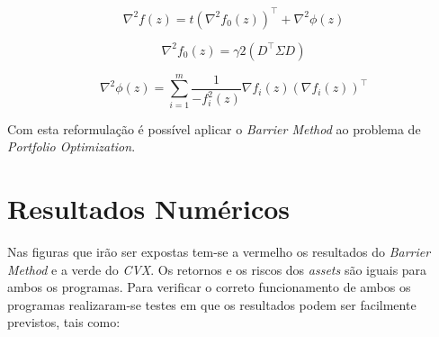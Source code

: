 \documentclass[a4paper]{IEEEtran}
\begin{document}
\begin{equation}
\label{eq.hess}
\nabla^2 f(z) = t (\nabla^2 f_0(z))^\top + \nabla^2 \phi (z)
\end{equation}

\begin{equation}
\label{eq.hesss}
\nabla^2 f_0 (z) = \gamma 2 (D^\top \Sigma D) 
\end{equation}

\begin{equation}
\label{eq.hessss}
\nabla^2 \phi (z) = \sum_{i=1}^{m} \frac{1}{-f_i^2 (z)} \nabla f_i (z) (\nabla f_i (z))^\top
\end{equation}

Com esta reformulação é possível aplicar o \textit{Barrier Method} ao problema de \textit{Portfolio Optimization}.

\section{Resultados Numéricos}
\label{sec:numerical-results}

Nas figuras que irão ser expostas tem-se a vermelho os resultados do \textit{Barrier Method} e a verde do \textit{CVX}.  Os retornos e os riscos dos \textit{assets} são iguais para ambos os programas.
Para verificar o correto funcionamento de ambos os programas realizaram-se testes em que os resultados podem ser facilmente previstos, tais como:
\end{document}
